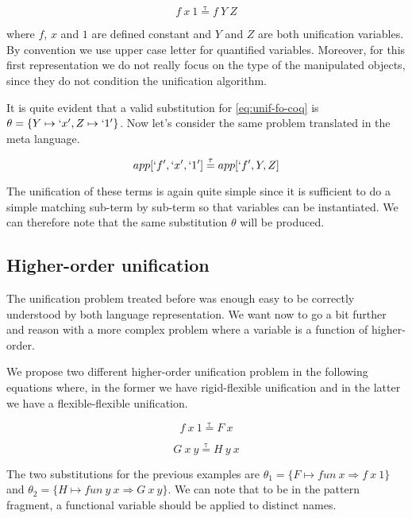 \documentclass[sigconf,natbib=false]{acmart}
\newcommand*{\eqtau}{\ensuremath{\mathrel{\overset{\mathrm{\tau}}{=}}}}
\begin{document}
\begin{equation}
  f\ x\ 1 \eqtau f\ Y\ Z
  \label{eq:unif-fo-coq}
\end{equation}

\noindent where $f$, $x$ and $1$ are defined constant and $Y$ and $Z$ are both
unification variables. By convention we use upper case letter for quantified
variables. Moreover, for this first representation we do not really focus on the
type of the manipulated objects, since they do not condition the unification
algorithm.

It is quite evident that a valid substitution for \cref{eq:unif-fo-coq} is $\theta =
\{Y \mapsto `x', Z \mapsto `1'\}$. Now let's consider the same problem translated in
the meta language.

\begin{equation}
  app[`f', `x', `1'] \eqtau app[`f', Y, Z]
  \label{eq:unif-fo-elpi}
\end{equation}

The unification of these terms is again quite simple since it is sufficient to
do a simple matching sub-term by sub-term so that variables can be instantiated.
We can therefore note that the same substitution $\theta$ will be produced.

\subsection{Higher-order unification}

The unification problem treated before was enough easy to be correctly
understood by both language representation. We want now to go a bit further and
reason with a more complex problem where a variable is a function of
higher-order. 

We propose two different higher-order unification problem in the following
equations where, in the former we have rigid-flexible unification and in the
latter we have a flexible-flexible unification.

\begin{equation}
  f\ x\ 1 \eqtau F\ x
  \label{eq:unif-ho-coq1}
\end{equation}

\begin{equation}
  G\ x\ y \eqtau H\ y\ x
  \label{eq:unif-ho-coq2}
\end{equation}

The two substitutions for the previous examples are $\theta_1 = \{F \mapsto fun\
x \Rightarrow f\ x\ 1\}$ and $\theta_2 = \{H \mapsto fun\ y\ x \Rightarrow G\ x\
y\}$. We can note that to be in the pattern fragment, a functional variable
should be applied to distinct names.
\end{document}
